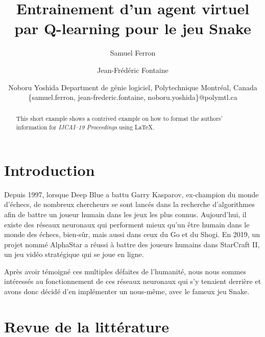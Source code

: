 \documentclass{article}
\title{Entrainement d'un agent virtuel par Q-learning pour le jeu Snake}
\author{
Samuel Ferron\and
Jean-Frédéric Fontaine\and
Noboru Yoshida
\affiliations
Department de génie logiciel, Polytechnique Montréal, Canada\\
\emails
\{samuel.ferron, jean-frederic.fontaine, noboru.yoshida\}@polymtl.ca
}
\begin{document}
\maketitle

\begin{abstract}
This short example shows a contrived example on how to format the authors' information for {\it IJCAI--19 Proceedings} using \LaTeX{}.
\end{abstract}

\section{Introduction}

Depuis 1997, lorsque Deep Blue a battu Garry Kasparov, ex-champion du monde d’échecs, de nombreux chercheurs se sont lancés dans la recherche d’algorithmes afin de battre un joueur humain dans les jeux les plus connus. Aujourd’hui, il existe des réseaux neuronaux qui performent mieux qu’un être humain dans le monde des échecs, bien-sûr, mais aussi dans ceux du Go et du Shogi. En 2019, un projet nommé AlphaStar a réussi à battre des joueurs humains dans StarCraft II, un jeu vidéo stratégique qui se joue en ligne.\linebreak

Après avoir témoigné ces multiples défaites de l’humanité, nous nous sommes intéressés au fonctionnement de ces réseaux neuronaux qui s’y tenaient derrière et avons donc décidé d’en implémenter un nous-même, avec le fameux jeu Snake.

\section{Revue de la littérature}
 
\end{document}
